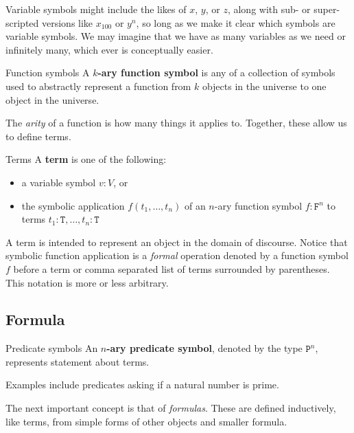 \documentclass[10pt]{article}
\newcommand{\type}[1]{\texttt{#1}}
\begin{document}
	\noindent 
	Variable symbols might include the likes of $x$, $y$, or $z$, along with sub- or super-scripted versions like $x_{100}$ or $y^n$, so long as we make it clear which symbols are variable symbols.
	We may imagine that we have as many variables as we need or infinitely many, which ever is conceptually easier.
	
	\begin{definition}{Function symbols}{}
		A {\bf $k$-ary function symbol} is any of a collection of symbols used to abstractly represent a function from $k$ objects in the universe to one object in the universe.
	\end{definition}

	\noindent
	The \emph{arity} of a function is how many things it applies to.
	Together, these allow us to define terms.
	
	\begin{definition}{Terms}{}
		A {\bf term} is one of the following:
		\begin{itemize}[noitemsep,topsep=0pt]
			\item a variable symbol $v:V$, or
			\item the symbolic application $f(t_1,\ldots,t_n)$ of an $n$-ary function symbol $f:\type{F}^n$ to terms $t_1:\type{T},\ldots,t_n:\type{T}$
		\end{itemize}
	\end{definition}

	\noindent
	A term is intended to represent an object in the domain of discourse.
	Notice that symbolic function application is a \emph{formal} operation denoted by a function symbol $f$ before a term or comma separated list of terms surrounded by parentheses.
	This notation is more or less arbitrary.
	
	\subsection{Formula}
	
	\begin{definition}{Predicate symbols}{}
		An {\bf $n$-ary predicate symbol}, denoted by the type $\type{P}^n$, represents  statement about terms.
	\end{definition}

	\noindent
	Examples include predicates asking if a natural number is prime.
	
	The next important concept is that of \emph{formulas}.
	These are defined inductively, like terms, from simple forms of other objects and smaller formula.
	
\end{document}
